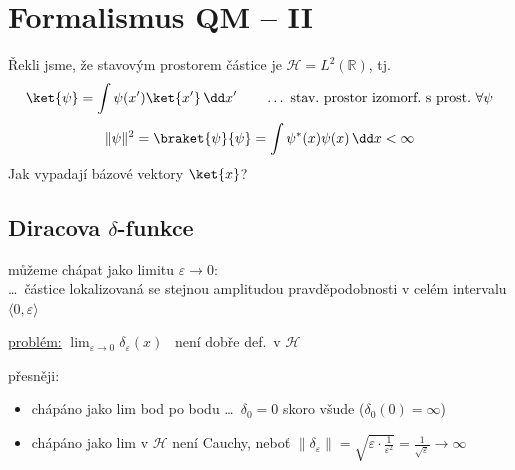 \section{Formalismus QM -- II}

Řekli jsme, že stavovým prostorem částice je $\mathcal{H} = L^2(\mathbb{R})$, tj.
\[
  \ket{\psi} = \int\psi(x')\ket{x'}\,\dd x' \qquad\dots\ \text{stav.\ prostor izomorf.\ s prost.\ } \forall\psi
\]
\[
  \|\psi\|^2 = \braket{\psi}{\psi} = \int\psi^*(x)\psi(x)\,\dd x < \infty
\]
Jak vypadají bázové vektory $\ket{x}$?

\subsection*{Diracova $\delta$-funkce}
\begin{minipage}{0.6\textwidth}
můžeme chápat jako limitu $\varepsilon\to 0$: \\
\dots\ částice lokalizovaná se stejnou amplitudou pravděpodobnosti v celém intervalu $\langle 0,\varepsilon\rangle$
\end{minipage}
\begin{minipage}{0.38\textwidth}
\end{minipage}

\underline{problém:} \quad $\lim_{\varepsilon\to 0}\delta_\varepsilon(x)$ \ není dobře def.\ v $\mathcal{H}$

přesněji:
\begin{itemize}[nosep]
  \item[--] chápáno jako lim bod po bodu \dots\ $\delta_0 = 0$ skoro všude \quad ($\delta_0(0) = \infty$)
  \item[--] chápáno jako lim v $\mathcal{H}$ není Cauchy, neboť $\|\delta_\varepsilon\| = \sqrt{\varepsilon\cdot\frac{1}{\varepsilon^2}} = \frac{1}{\sqrt\varepsilon}\to\infty$
\end{itemize}

